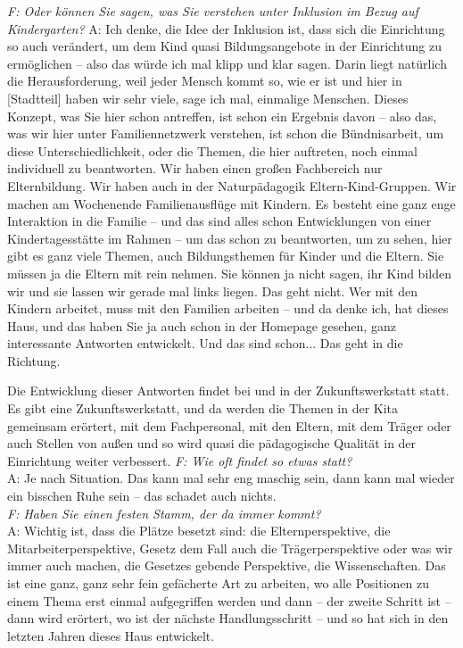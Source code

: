 \begin{linenumbers*}
\emph{F: Oder können Sie sagen, was Sie verstehen unter Inklusion im Bezug auf Kindergarten?}
A: Ich denke, die Idee der Inklusion ist, dass sich die Einrichtung so auch verändert, um dem Kind quasi Bildungsangebote in der Einrichtung zu ermöglichen -- also das würde ich mal klipp und klar sagen. Darin liegt natürlich die Herausforderung, weil jeder Mensch kommt so, wie er ist und hier in [Stadtteil] haben wir sehr viele, sage ich mal, einmalige Menschen. Dieses Konzept, was Sie hier schon antreffen, ist schon ein Ergebnis davon -- also das, was wir hier unter Familiennetzwerk verstehen, ist schon die Bündnisarbeit, um diese Unterschiedlichkeit, oder die Themen, die hier auftreten, noch einmal individuell zu beantworten. 
Wir haben einen großen Fachbereich nur Elternbildung. Wir haben auch in der Naturpädagogik Eltern-Kind-Gruppen. Wir machen am Wochenende Familienausflüge mit Kindern. Es besteht eine ganz enge Interaktion in die Familie -- und das sind alles schon Entwicklungen von einer Kindertagesstätte im Rahmen -- um das schon zu beantworten, um zu sehen, hier gibt es ganz viele Themen, auch Bildungsthemen für Kinder und die Eltern.
Sie müssen ja die Eltern mit rein nehmen. Sie können ja nicht sagen, ihr Kind bilden wir und sie lassen wir gerade mal links liegen. Das geht nicht. Wer mit den Kindern arbeitet, muss mit den Familien arbeiten -- und da denke ich, hat dieses Haus, und das haben Sie ja auch schon in der Homepage gesehen, ganz interessante Antworten entwickelt. Und das sind schon... Das geht in die Richtung.  

Die Entwicklung dieser Antworten findet bei und in der Zukunftswerkstatt statt. Es gibt eine Zukunftswerkstatt, und da werden die Themen in der Kita gemeinsam erörtert, mit dem Fachpersonal, mit den Eltern, mit dem Träger oder auch Stellen von außen und so wird quasi die pädagogische Qualität in der Einrichtung weiter verbessert.
\emph{F: Wie oft findet so etwas statt?}\\
A: Je nach Situation. Das kann mal sehr eng maschig sein, dann kann mal wieder ein bisschen Ruhe sein -- das schadet auch nichts.\\ 
\emph{F: Haben Sie einen festen Stamm, der da immer kommt?}\\
A: Wichtig ist, dass die Plätze besetzt sind: die Elternperspektive, die Mitarbeiterperspektive, Gesetz dem Fall auch die Trägerperspektive oder was wir immer auch machen, die Gesetzes gebende Perspektive, die Wissenschaften. Das ist eine ganz, ganz sehr fein gefächerte Art zu arbeiten, wo alle Positionen zu einem Thema erst einmal aufgegriffen werden und dann -- der zweite Schritt ist -- dann wird erörtert, wo ist der nächste Handlungsschritt -- und so hat sich in den letzten Jahren dieses Haus entwickelt. 


\end{linenumbers*}
